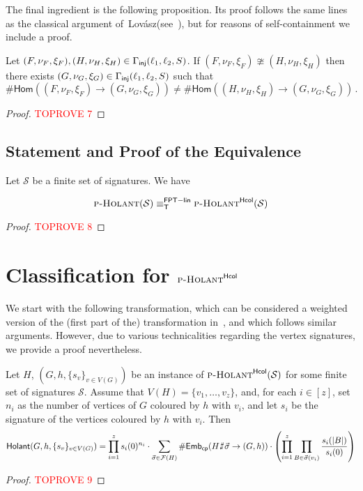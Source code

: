 \documentclass[authorcolumns,numberwithinsect]{no-lipics-v2022}
\newcommand{\homs}[2]{\mathsf{Hom}(#1 \to #2)}
\newcommand{\lovasz}{Lov{\'{a}}sz}
\newcommand{\fptinterlinred}{\equiv^{\mathsf{FPT-lin}}_{\mathsf{T}}}
\def\fracture#1#2{\ensuremath{#1\raisebox{.2ex}{\rotatebox[origin=c]{-15}{$\sharp$}}#2}}
\newcommand{\holantprob}{\text{\sc{p-Holant}}}
\newcommand{\holantprobstar}{\text{\sc{p-Holant}}^{\mathsf{Hcol}}}
\newcommand{\embscp}{\mathsf{Emb}_{\mathsf{cp}}}
\newcommand{\holant}{\mathsf{Holant}}
\def\fracture#1#2{\ensuremath{#1\raisebox{.2ex}{\rotatebox[origin=c]{-15}{$\sharp$}}#2}}
\begin{document}
The final ingredient is the following proposition. Its  proof follows the same lines as the classical argument of~\lovasz (see~\cite[Chapter 5.4]{Lovasz12}), but for reasons of self-containment we include a proof.


\begin{proposition}\label{prop:distinct}
    Let $(F,\nu_F,\xi_F),(H,\nu_H,\xi_H) \in \Gamma_{\text{\sf{inj}}}(\ell_1,\ell_2,S)$. If $(F,\nu_F,\xi_F)\ncong (H,\nu_H,\xi_H)$ then there exists $(G,\nu_G,\xi_G)\in \Gamma_{\text{\sf{inj}}}(\ell_1,\ell_2,S)$ such that
    \[ \#\homs{(F,\nu_F,\xi_F)}{(G,\nu_G,\xi_G)} \neq \#\homs{(H,\nu_H,\xi_H)}{(G,\nu_G,\xi_G)} \,.\]
\end{proposition}
\begin{proof}\textcolor{red}{TOPROVE 7}\end{proof}

\subsection{Statement and Proof of the Equivalence}

\begin{lemma}\label{lem:main_equivalence_hard}
    Let $\mathcal{S}$ be a finite set of signatures. We have
    
    \[ \holantprob(\mathcal{S}) \fptinterlinred \holantprobstar(\mathcal{S}) \]
\end{lemma}
\begin{proof}\textcolor{red}{TOPROVE 8}\end{proof}

\section{Classification for $\holantprobstar$}

We start with the following transformation, which can be considered a weighted version of the (first part of the) transformation in~\cite[Lemma 4.1]{PeyerimhoffRSSVW23}, and which follows similar arguments. However, due to various technicalities regarding the vertex signatures, we provide a proof nevertheless. 

\begin{lemma}\label{lem:holant_star_to_cpembs}
Let $H$, $(G,h,\{s_v\}_{v\in V(G)})$ be an instance of $\holantprobstar(\mathcal{S})$ for some finite set of signatures $\mathcal{S}$. Assume that $V(H)=\{v_1,\dots,v_z\}$, and, for each $i\in [z]$, set $n_i$ as the number of vertices of $G$ coloured by $h$ with $v_i$, and let $s_i$ be the signature of the vertices coloured by $h$ with $v_i$. 
    Then
    \[ \holant(G,h,\{s_v\}_{v\in V(G)}) = \prod_{i=1}^z s_i(0)^{n_i} \cdot \sum_{\vec{\sigma}\in \mathcal{F}(H)} \#\embscp(\fracture{H}{\vec{\sigma}} \to (G,h)) \cdot \left(\prod_{i=1}^z \prod_{B \in \vec{\sigma}(v_i)} \frac{s_i(|B|)}{s_i(0)}  \right) \]
\end{lemma}
\begin{proof}\textcolor{red}{TOPROVE 9}\end{proof}
\end{document}
